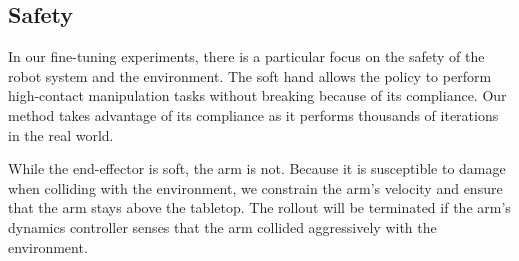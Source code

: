 \subsection{Safety} 

In our fine-tuning experiments, there is a particular focus on the safety of the robot system and the environment. The soft hand allows the policy to perform high-contact manipulation tasks without breaking because of its compliance. Our method takes advantage of its compliance as it performs thousands of iterations in the real world.

While the end-effector is soft, the arm is not. Because it is susceptible to damage when colliding with the environment, we constrain the arm's velocity and ensure that the arm stays above the tabletop. The rollout will be terminated if the arm's dynamics controller senses that the arm collided aggressively with the environment.
 